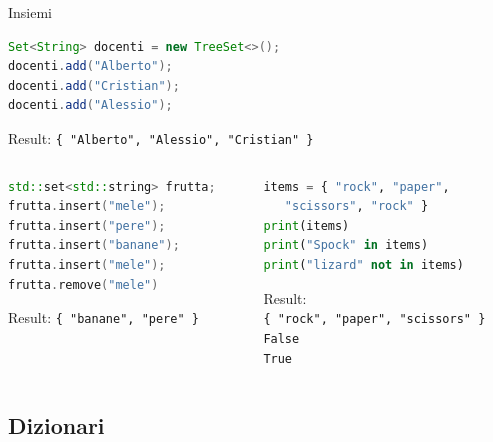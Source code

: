 \begin{frame}[fragile,shrink=18]{Insiemi}

\vspace{-6pt}
\begin{myboxtitle}[Java]
\vspace{-6pt}
\begin{lstlisting}[language=Java]
Set<String> docenti = new TreeSet<>();
docenti.add("Alberto");
docenti.add("Cristian");
docenti.add("Alessio");
\end{lstlisting}
\alert{Result}: \texttt{\{ "Alberto", "Alessio", "Cristian" \}}
\end{myboxtitle}

\vspace{-6pt}
\begin{columns}[T]
\begin{column}{0.48\textwidth}
\begin{myboxtitle}[C++]
\vspace{-6pt}
\begin{lstlisting}[language=C++]
std::set<std::string> frutta;
frutta.insert("mele");
frutta.insert("pere");
frutta.insert("banane");
frutta.insert("mele");
frutta.remove("mele")
\end{lstlisting}
\alert{Result}: \texttt{\{ "banane", "pere" \}}
\end{myboxtitle}
\end{column}
\begin{column}{0.48\textwidth}
\begin{myboxtitle}[Python]
\vspace{-6pt}
\begin{lstlisting}[language=python]
items = { "rock", "paper", 
   "scissors", "rock" } 
print(items) 
print("Spock" in items) 
print("lizard" not in items) 
\end{lstlisting}
\alert{Result}:\\
\texttt{\{ "rock", "paper", "scissors" \}} \\
\texttt{False} \\
\texttt{True} 
\end{myboxtitle}
\end{column}
\end{columns}

\end{frame}


\subsection{Dizionari}


